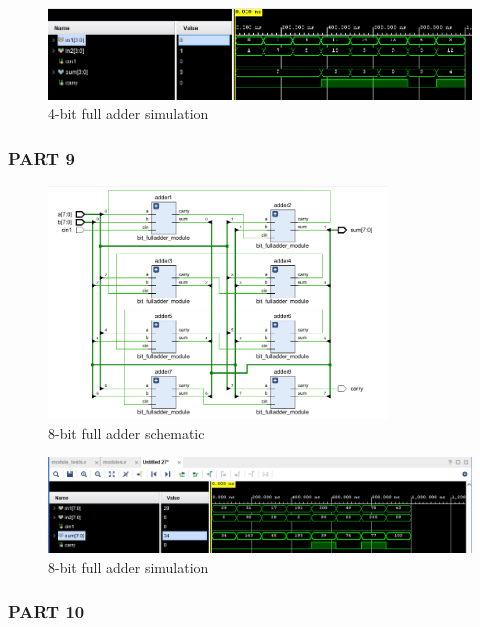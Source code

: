 \documentclass[pdftex,12pt,a4paper]{article}
\begin{document}
    \begin{figure}[H]
    	\centering
    	\includegraphics[width=1\textwidth]{simulations/4bitadder_sim.png}	
    	\caption{4-bit full adder simulation}
    	\label{4-bit full adder simulation}
    \end{figure}
\subsubsection{PART 9}
    \begin{figure}[H]
    	\centering
    	\includegraphics[width=0.8\textwidth]{schematic/8bitadder_schematic.png}	
    	\caption{8-bit full adder schematic}
    	\label{8-bit full adder schematic}
    \end{figure}
    
    \begin{figure}[H]
    	\centering
    	\includegraphics[width=1\textwidth]{simulations/8bitadder_sim.png}	
    	\caption{8-bit full adder simulation}
    	\label{8-bit full adder simulation}
    \end{figure}


    
\subsubsection{PART 10}
\end{document}
